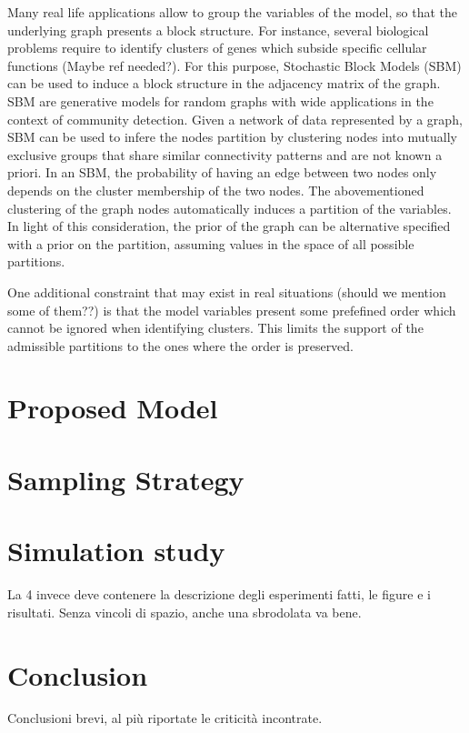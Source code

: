 Many real life applications allow to group the variables of the model, so that the underlying graph presents a block structure. For instance, several biological problems require to identify clusters of genes which subside specific cellular functions (Maybe ref needed?). For this purpose, Stochastic Block Models (SBM) can be used to induce a block structure in the adjacency matrix of the graph. SBM are generative models for random graphs with wide applications in the context of community detection. Given a network of data represented by a graph, SBM can be used to infere the nodes partition by clustering nodes into mutually exclusive groups that share similar connectivity patterns and are not known a priori. In an SBM, the probability of having an edge between two nodes only depends on the cluster membership of the two nodes. The abovementioned clustering of the graph nodes automatically induces a partition of the variables. In light of this consideration, the prior of the graph can be alternative specified with a prior on the partition, assuming values in the space of all possible partitions.

One additional constraint that may exist in real situations (should we mention some of them??) is that the model variables present some prefefined order which cannot be ignored when identifying clusters. This limits the support of the admissible partitions to the ones where the order is preserved.     





\section{Proposed Model}


\section{Sampling Strategy}


\section{Simulation study}

La 4 invece deve contenere la descrizione degli esperimenti fatti, le figure e i risultati. Senza vincoli di spazio, anche una sbrodolata va bene.


\section{Conclusion}

Conclusioni brevi, al più riportate le criticità incontrate.